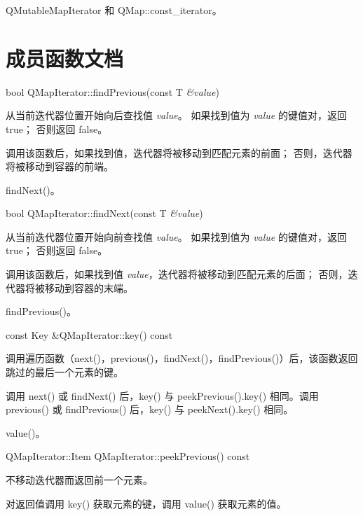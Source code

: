 \begin{notice}[另请参阅]
QMutableMapIterator 和 QMap::const\_iterator。
\end{notice}


\section{成员函数文档}

bool QMapIterator::findPrevious(const T \emph{\&value})

从当前迭代器位置开始向后查找值 \emph{value}。
如果找到值为 \emph{value} 的键值对，返回 true；
否则返回 false。

调用该函数后，如果找到值，迭代器将被移动到匹配元素的前面；
否则，迭代器将被移动到容器的前端。

\begin{notice}[另请参阅]
findNext()。
\end{notice}

\splitLine

bool QMapIterator::findNext(const T \emph{\&value})

从当前迭代器位置开始向前查找值 \emph{value}。
如果找到值为 \emph{value} 的键值对，返回 true；
否则返回 false。

调用该函数后，如果找到值 \emph{value}，迭代器将被移动到匹配元素的后面；
否则，迭代器将被移动到容器的末端。

\begin{notice}[另请参阅]
findPrevious()。
\end{notice}
    
\splitLine

const Key \&QMapIterator::key() const

调用遍历函数（next()，previous()，findNext()，findPrevious()）后，该函数返回跳过的最后一个元素的键。

调用 next() 或 findNext() 后，key() 与 peekPrevious().key() 相同。调用 previous() 或 findPrevious() 后，key() 与 peekNext().key() 相同。

\begin{notice}[另请参阅]
value()。
\end{notice}

\splitLine

QMapIterator::Item QMapIterator::peekPrevious() const

不移动迭代器而返回前一个元素。

对返回值调用 key() 获取元素的键，调用 value() 获取元素的值。

